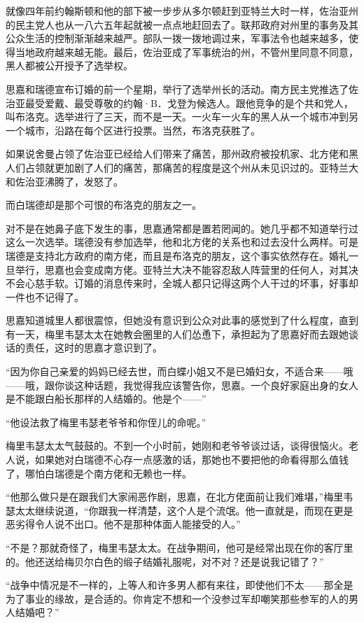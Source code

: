 \par 就像四年前约翰斯顿和他的部下被一步步从多尔顿赶到亚特兰大时一样，佐治亚州的民主党人也从一八六五年起就被一点点地赶回去了。联邦政府对州里的事务及其公众生活的控制渐渐越来越严。部队一拨一拨地调过来，军事法令也越来越多，使得当地政府越来越无能。最后，佐治亚成了军事统治的州，不管州里同意不同意，黑人都被公开授予了选举权。
\par 思嘉和瑞德宣布订婚的前一个星期，举行了选举州长的活动。南方民主党推选了佐治亚最受爱戴、最受尊敬的约翰·B．戈登为候选人。跟他竞争的是个共和党人，叫布洛克。选举进行了三天，而不是一天。一火车一火车的黑人从一个城市冲到另一个城市，沿路在每个区进行投票。当然，布洛克获胜了。
\par 如果说舍曼占领了佐治亚已经给人们带来了痛苦，那州政府被投机家、北方佬和黑人们占领就更加剧了人们的痛苦，那痛苦的程度是这个州从未见识过的。亚特兰大和佐治亚沸腾了，发怒了。
\par 而白瑞德却是那个可恨的布洛克的朋友之一。
\par 对不是在她鼻子底下发生的事，思嘉通常都是置若罔闻的。她几乎都不知道举行过这么一次选举。瑞德没有参加选举，他和北方佬的关系也和过去没什么两样。可是瑞德是支持北方政府的南方佬，而且是布洛克的朋友，这个事实依然存在。婚礼一旦举行，思嘉也会变成南方佬。亚特兰大决不能容忍敌人阵营里的任何人，对其决不会心慈手软。订婚的消息传来时，全城人都只记得这两个人干过的坏事，好事却一件也不记得了。
\par 思嘉知道城里人都很震惊，但她没有意识到公众对此事的感觉到了什么程度，直到有一天，梅里韦瑟太太在她教会圈里的人们怂恿下，承担起为了思嘉好而去跟她谈话的责任，这时的思嘉才意识到了。
\par “因为你自己亲爱的妈妈已经去世，而白蝶小姐又不是已婚妇女，不适合来——哦——哦，跟你谈这种话题，我觉得我应该警告你，思嘉。一个良好家庭出身的女人是不能跟白船长那样的人结婚的。他是个——”
\par “他设法救了梅里韦瑟老爷爷和你侄儿的命呢。”
\par 梅里韦瑟太太气鼓鼓的。不到一个小时前，她刚和老爷爷谈过话，谈得很恼火。老人说，如果她对白瑞德不心存一点感激的话，那她也不要把他的命看得那么值钱了，哪怕白瑞德是个南方佬和无赖也一样。
\par “他那么做只是在跟我们大家闹恶作剧，思嘉，在北方佬面前让我们难堪，”梅里韦瑟太太继续说道，“你跟我一样清楚，这个人是个流氓。他一直就是，而现在更是恶劣得令人说不出口。他不是那种体面人能接受的人。”
\par “不是？那就奇怪了，梅里韦瑟太太。在战争期间，他可是经常出现在你的客厅里的。他还送给梅贝尔白色的缎子结婚礼服呢，对不对？还是说我记错了？”
\par “战争中情况是不一样的，上等人和许多男人都有来往，即使他们不太——那全是为了事业的缘故，是合适的。你肯定不想和一个没参过军却嘲笑那些参军的人的男人结婚吧？”

